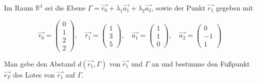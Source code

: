 Im Raum $\mathbb{R}^4$ sei die Ebene $\Gamma = \vec{r_0} + \lambda_1 \vec{a_1} + \lambda_2 \vec{a_2}$, sowie der Punkt $\vec{r_1}$ gegeben mit

\[
\vec{r_0} = \begin{pmatrix} 0 \\ 1 \\ 2 \\ 2 \end{pmatrix}, \quad
\vec{r_1} = \begin{pmatrix} 1 \\ 3 \\ 5 \end{pmatrix}, \quad
\vec{a_1} = \begin{pmatrix} 1 \\ 1 \\ 0 \end{pmatrix}, \quad
\vec{a_2} = \begin{pmatrix} 0 \\ -1 \\ 1 \end{pmatrix}
\]

Man gebe den Abstand $d(\vec{r_1}, \Gamma)$ von $\vec{r_1}$ und $\Gamma$ an und bestimme den Fußpunkt $\vec{r_F}$ des Lotes von $\vec{r_1}$ auf $\Gamma$.